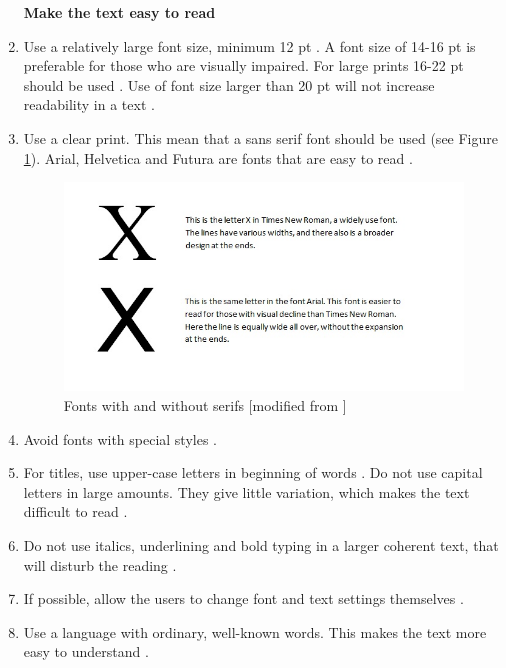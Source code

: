 \begin{enumerate}[{g}.1]
\textbf{Make the text easy to read}

\item Use a relatively large font size, minimum 12 pt \cite{blindeforbundetTekst}. A font size of 14-16 pt is preferable for those who are visually impaired. For large prints 16-22 pt should be used \cite{actionforblindpeopleTekst}. Use of font size larger than 20 pt will not increase readability in a text \cite{blindeforbundetTekst}.     
\item Use a clear print. This mean that a sans serif font should be used (see Figure \ref{fig:fonts}). Arial, Helvetica and Futura are fonts that are easy to read \cite{actionforblindpeopleTekst}.
\begin{figure} [ht!]
\centering
\includegraphics[scale=0.75]{fontExample.jpg}
\caption[Fonts]{Fonts with and without serifs [modified from \cite{blindeforbundetTekst}]}
\label{fig:fonts}
\end{figure}

\item Avoid fonts with special styles \cite{blindeforbundetTekst} \cite{actionforblindpeopleTekst}.
\item For titles, use upper-case letters in beginning of words \cite{actionforblindpeopleTekst}. Do not use capital letters in large amounts. They give little variation, which makes the text difficult to read \cite{blindeforbundetTekst}. 
\item Do not use italics, underlining and bold typing in a larger coherent text, that will disturb the reading \cite{blindeforbundetTekst} \cite{actionforblindpeopleTekst}.  
\item If possible, allow the users to change font and text settings themselves \cite{blindeforbundetTekst} \cite{w3cTekst}. 
\item Use a language with ordinary, well-known words. This makes the text more easy to understand \cite{w3cTekst}. \\ 



\end{enumerate}
